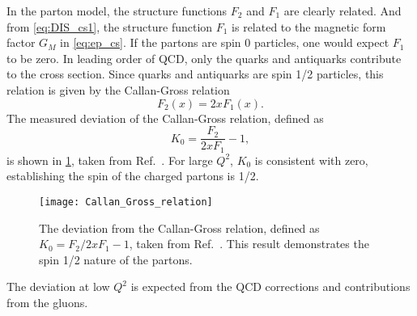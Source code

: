 \documentclass[../main.tex]{subfiles}
\begin{document}
In the parton model, the structure functions $F_2$ and $F_1$ are clearly related. And
from \cref{eq:DIS_cs1}, the structure function $F_1$ is
related to the magnetic form factor $G_M$ in \cref{eq:ep_cs}. If the partons
are spin 0 particles, one would expect $F_1$ to be zero. In leading order of QCD,
only the quarks and antiquarks contribute to the cross section. Since quarks and
antiquarks are spin 1/2 particles, this relation is given by the Callan-Gross
relation~\cite{callan1968,callan1969}
\begin{equation}
	F_2\left(x\right) = 2x F_1\left(x\right).
	\label{eq:CS_relation}
\end{equation}
The measured deviation of the Callan-Gross relation, defined as
\begin{equation}
	K_0 = \frac{F_2}{2xF_1}-1,
\end{equation}
is shown in \cref{fig:callan_gross}, taken from Ref.~\cite{kendall1991}.
For large $Q^2$, $K_0$ is consistent with zero, establishing the spin of the
charged partons is 1/2.
\begin{figure}[htbp!]
	\centering
	\texttt{[image: Callan\_Gross\_relation]}
	\caption{The deviation from the Callan-Gross relation, defined as
		$K_0=F_2/2xF_1 -1$, taken from Ref.~\cite{kendall1991}. This result
		demonstrates the spin 1/2 nature of the partons.}
	\label{fig:callan_gross}
\end{figure}
The deviation at low $Q^2$ is expected from the QCD corrections and contributions from
the gluons.
\end{document}
